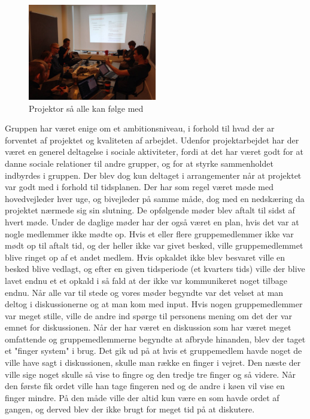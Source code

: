 \begin{figure}[ht!]
    \centering
    \includegraphics[width=0.5\textwidth]{Images/8.jpg}
    \caption{Projektor så alle kan følge med}
    \label{fig:4}
\end{figure}
Gruppen har været enige om et ambitionsniveau, i forhold til hvad der ar forventet af projektet og kvaliteten af arbejdet. Udenfor projektarbejdet har der været en generel deltagelse i sociale aktiviteter, fordi at det har været godt for at danne sociale relationer til andre grupper, og for at styrke sammenholdet indbyrdes i gruppen. Der blev dog kun deltaget i arrangementer når at projektet var godt med i forhold til tidsplanen. 
Der har som regel været møde med hovedvejleder hver uge, og bivejleder på samme måde, dog med en nedskæring da projektet nærmede sig sin slutning. De opfølgende møder blev aftalt til sidst af hvert møde. Under de daglige møder har der også været en plan, hvis det var at nogle medlemmer ikke mødte op. Hvis et eller flere gruppemedlemmer ikke var mødt op til aftalt tid, og der heller ikke var givet besked, ville gruppemedlemmet blive ringet op af et andet medlem. Hvis opkaldet ikke blev besvaret ville en besked blive vedlagt, og efter en given tidsperiode (et kvarters tids) ville der blive lavet endnu et et opkald i så fald at der ikke var kommunikeret noget tilbage endnu. Når alle var til stede og vores møder begyndte var det velset at man deltog i diskussionerne og at man kom med input. Hvis nogen gruppemedlemmer var meget stille, ville de andre ind spørge til personens mening om det der var emnet for diskussionen. Når der har været en diskussion som har været meget omfattende og gruppemedlemmerne begyndte at afbryde hinanden, blev der taget et "finger system" i brug. Det gik ud på at hvis et gruppemedlem havde noget de ville have sagt i diskussionen, skulle man række en finger i vejret. Den næste der ville sige noget skulle så vise to fingre og den tredje tre finger og så videre. Når den første fik ordet ville han tage fingeren ned og de andre i køen vil vise en finger mindre. På den måde ville der altid kun være en som havde ordet af gangen, og derved blev der ikke brugt for meget tid på at diskutere.

